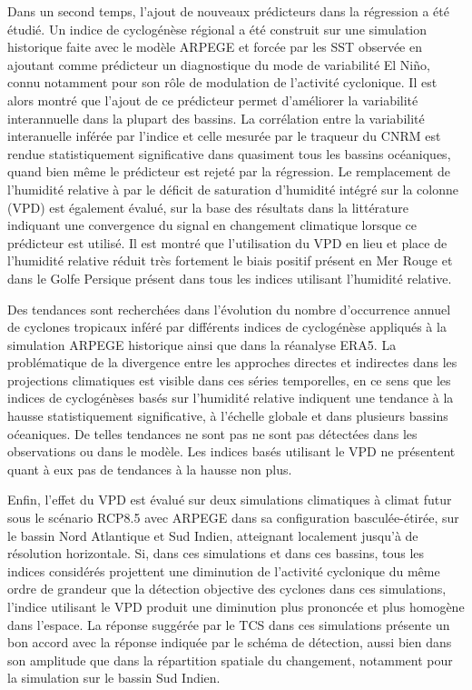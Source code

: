 \documentclass[../main.tex]{subfiles}
\begin{document}
Dans un second temps, l'ajout de nouveaux prédicteurs dans la régression a été étudié. Un indice de cyclogénèse régional a été construit sur une simulation
historique faite avec le modèle ARPEGE et forcée par les SST observée en ajoutant comme prédicteur un diagnostique du mode de variabilité El Niño, connu
notamment pour son rôle de modulation de l'activité cyclonique. Il est alors montré que l'ajout de ce prédicteur permet d'améliorer la variabilité interannuelle
dans la plupart des bassins. La corrélation entre la variabilité interanuelle inférée par l'indice et celle mesurée par le traqueur du CNRM est rendue
statistiquement significative dans quasiment tous les bassins océaniques, quand bien même le prédicteur est rejeté par la régression. Le remplacement de
l'humidité relative à  par le déficit de saturation d'humidité intégré sur la colonne (VPD) est également évalué, sur la base des résultats dans la
littérature indiquant une convergence du signal en changement climatique lorsque ce prédicteur est utilisé. Il est montré que l'utilisation du VPD en lieu et
place de l'humidité relative réduit très fortement le biais positif présent en Mer Rouge et dans le Golfe Persique présent dans tous les indices utilisant
l'humidité relative.

Des tendances sont recherchées dans l'évolution du nombre d'occurrence annuel de cyclones tropicaux inféré par différents indices de cyclogénèse appliqués à la
simulation ARPEGE historique ainsi que dans la réanalyse ERA5. La problématique de la divergence entre les approches directes et indirectes dans les projections
climatiques est visible dans ces séries temporelles, en ce sens que les indices de cyclogénèses basés sur l'humidité relative indiquent une tendance à la hausse
statistiquement significative, à l'échelle globale et dans plusieurs bassins oćeaniques. De telles tendances ne sont pas ne sont pas détectées dans les
observations ou dans le modèle. Les indices basés utilisant le VPD ne présentent quant à eux pas de tendances à la hausse non plus.

Enfin, l'effet du VPD est évalué sur deux simulations climatiques à climat futur sous le scénario RCP8.5 avec ARPEGE dans sa configuration basculée-étirée, sur
le bassin Nord Atlantique et Sud Indien, atteignant localement jusqu'à  de résolution horizontale. Si, dans ces simulations et dans ces bassins, tous les
indices considérés projettent une diminution de l'activité cyclonique du même ordre de grandeur que la détection objective des cyclones dans ces simulations,
l'indice utilisant le VPD produit une diminution plus prononcée et plus homogène dans l'espace. La réponse suggérée par le TCS dans ces simulations présente un
bon accord avec la réponse indiquée par le schéma de détection, aussi bien dans son amplitude que dans la répartition spatiale du changement, notamment pour la
simulation sur le bassin Sud Indien.
\end{document}

